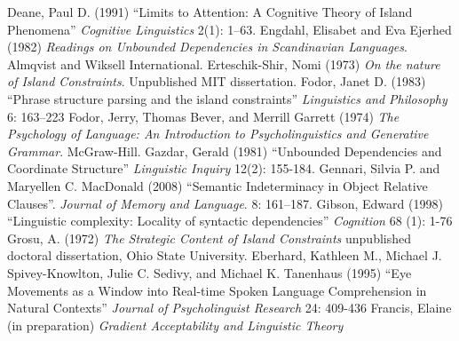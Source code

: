 \documentclass[a4paper]{article}
\begin{document}
\newline
\newline
Deane, Paul D. (1991) ``Limits to Attention: A Cognitive Theory
of Island Phenomena''
{\it Cognitive
Linguistics}
2(1): 1–63.
\newline
\newline
Engdahl, Elisabet and Eva Ejerhed (1982) {\it Readings on Unbounded Dependencies in Scandinavian Languages}.  Almqvist and Wiksell International.
\newline
\newline
Erteschik-Shir, Nomi (1973) {\it On the nature of Island Constraints}.  Unpublished MIT dissertation.
\newline
\newline
Fodor, Janet D. (1983) ``Phrase structure parsing and the island constraints''
{\it Linguistics and
Philosophy}
6: 163–223
\newline
\newline
Fodor, Jerry, Thomas Bever, and Merrill Garrett (1974) {\it The Psychology of Language: An Introduction to Psycholinguistics and Generative Grammar}.  McGraw-Hill.
\newline
\newline
Gazdar, Gerald (1981) ``Unbounded Dependencies and Coordinate Structure'' {\it Linguistic Inquiry} 12(2): 155-184.
\newline
\newline
Gennari, Silvia P. and Maryellen C. MacDonald (2008) ``Semantic Indeterminacy in Object Relative Clauses''.  {\it Journal of Memory and Language}.  8: 161–187.
\newline
\newline
Gibson, Edward (1998)
``Linguistic complexity: Locality of syntactic dependencies''
{\it Cognition} 68 (1): 1-76
\newline
\newline
 Grosu, A. (1972) {\it The Strategic Content of Island Constraints}
 unpublished doctoral dissertation, Ohio State University.
\newline
\newline
Eberhard, Kathleen M., Michael J. Spivey-Knowlton, Julie C. Sedivy, and Michael K. Tanenhaus (1995) ``Eye Movements as a Window into Real-time Spoken Language Comprehension in Natural Contexts'' {\it Journal of Psycholinguist Research} 24: 409-436
\newline
\newline
Francis, Elaine (in preparation) {\it Gradient Acceptability and Linguistic Theory}
\newline
\end{document}
